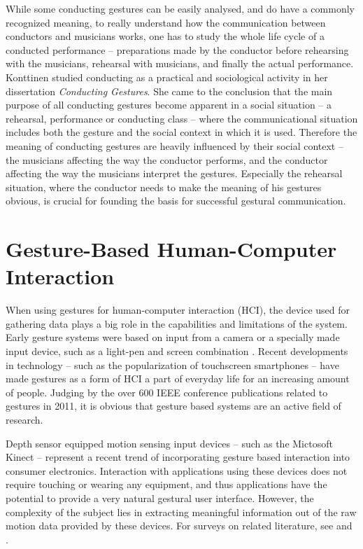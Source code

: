 While some conducting gestures can be easily analysed,
and do have a commonly recognized meaning,
to really understand how the communication between
conductors and musicians works,
one has to study the whole life cycle of a conducted performance --
preparations made by the conductor before rehearsing with the musicians,
rehearsal with musicians,
and finally the actual performance.
Konttinen \cite{konttinen2008} studied
conducting as a practical and sociological activity
in her dissertation \textit{Conducting Gestures}.
She came to the conclusion that the main purpose of all
conducting gestures become apparent in a social situation --
a rehearsal, performance or conducting class --
where the communicational situation includes both the gesture
and the social context in which it is used.
Therefore the meaning of conducting gestures are
heavily influenced by their social context --
the musicians affecting the way the conductor performs,
and the conductor affecting the way the musicians interpret the gestures.
Especially the rehearsal situation,
where the conductor needs to make the meaning of his gestures obvious,
is crucial for founding the basis for successful gestural communication.

\section{Gesture-Based Human-Computer Interaction}

When using gestures for human-computer interaction (HCI),
the device used for gathering data plays a big role
in the capabilities and limitations of the system.
Early gesture systems were based on input from
a camera or a specially made input device,
such as a light-pen and screen combination \cite{turk2002}.
Recent developments in technology --
such as the popularization of touchscreen smartphones --
have made gestures as a form of HCI
a part of everyday life for an increasing amount of people.
Judging by the over 600 IEEE conference publications related to gestures in 2011,
it is obvious that gesture based systems are an active field of research.

Depth sensor equipped motion sensing input devices --
such as the Mictosoft Kinect \cite{kinect_overview} --
represent a recent trend of incorporating gesture based interaction
into consumer electronics.
Interaction with applications using these devices
does not require touching or wearing any equipment,
and thus applications have the potential to provide
a very natural gestural user interface.
However, the complexity of the subject lies in extracting
meaningful information out of the raw motion data provided by these devices.
For surveys on related literature,
see \cite{Moeslund2006} and \cite{Weinland2011}.

